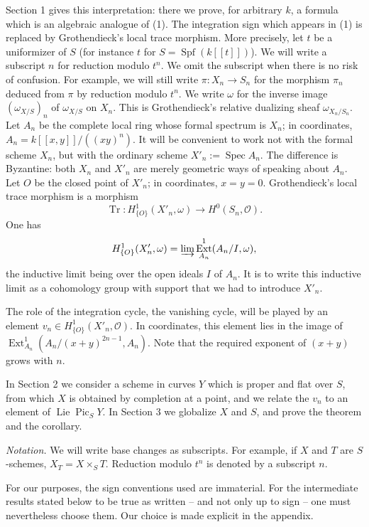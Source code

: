\documentclass[11pt]{article}
\DeclareMathOperator{\Spec}{Spec}
\DeclareMathOperator{\Spf}{Spf}
\DeclareMathOperator{\Lie}{Lie}
\DeclareMathOperator{\Pic}{Pic}
\DeclareMathOperator{\Ext}{Ext}
\DeclareMathOperator{\Tr}{Tr}
\newcommand{\OO}{\mathcal O}
\begin{document}
Section 1 gives this interpretation: there we prove, for arbitrary $k$, a formula which is an algebraic analogue of (1). The integration sign which appears in (1) is replaced by Grothendieck's local trace morphism. More precisely, let $t$ be a uniformizer of $S$ (for instance $t$ for $S=\Spf(k[[t]])$). We will write a subscript $n$ for reduction modulo $t^n$. We omit the subscript when there is no risk of confusion. For example, we will still write $\pi:X_n\to S_n$ for the morphism $\pi_n$ deduced from $\pi$ by reduction modulo $t^n$. We write $\omega$ for the inverse image $(\omega_{X/S})_n$ of $\omega_{X/S}$ on $X_n$. This is Grothendieck's relative dualizing sheaf $\omega_{X_n/S_n}$. Let $A_n$ be the complete local ring whose formal spectrum is $X_n$; in coordinates, $A_n=k[[x,y]]/((xy)^n)$. It will be convenient to work not with the formal scheme $X_n$, but with the ordinary scheme $X'_n:=\Spec A_n$. The difference is Byzantine: both $X_n$ and $X'_n$ are merely geometric ways of speaking about $A_n$. Let $O$ be the closed point of $X'_n$; in coordinates, $x=y=0$. Grothendieck's local trace morphism is a morphism
\[
        \Tr:H^1_{\{O\}}(X'_n,\omega)\longrightarrow H^0(S_n,\OO).
\]
One has
\[
        H^1_{\{O\}}(X'_n,\omega)=\varinjlim\Ext^1_{A_n}(A_n/I,\omega),
\]
the inductive limit being over the open ideals $I$ of $A_n$. It is to write this inductive limit as a cohomology group with support that we had to introduce $X'_n$.

The role of the integration cycle, the vanishing cycle, will be played by an element $v_n\in H^1_{\{O\}}(X'_n,\OO)$. In coordinates, this element lies in the image of $\Ext^1_{A_n}(A_n/(x+y)^{2n-1},A_n)$. Note that the required exponent of $(x+y)$ grows with $n$.

In Section 2 we consider a scheme in curves $Y$ which is proper and flat over $S$, from which $X$ is obtained by completion at a point, and we relate the $v_n$ to an element of $\Lie\Pic_S Y$. In Section 3 we globalize $X$ and $S$, and prove the theorem and the corollary.

\medskip
\noindent\emph{Notation.} We will write base changes as subscripts. For example, if $X$ and $T$ are $S$-schemes, $X_T=X\times_ST$. Reduction modulo $t^n$ is denoted by a subscript $n$.

For our purposes, the sign conventions used are immaterial. For the intermediate results stated below to be true as written -- and not only up to sign -- one must nevertheless choose them. Our choice is made explicit in the appendix.
\end{document}
